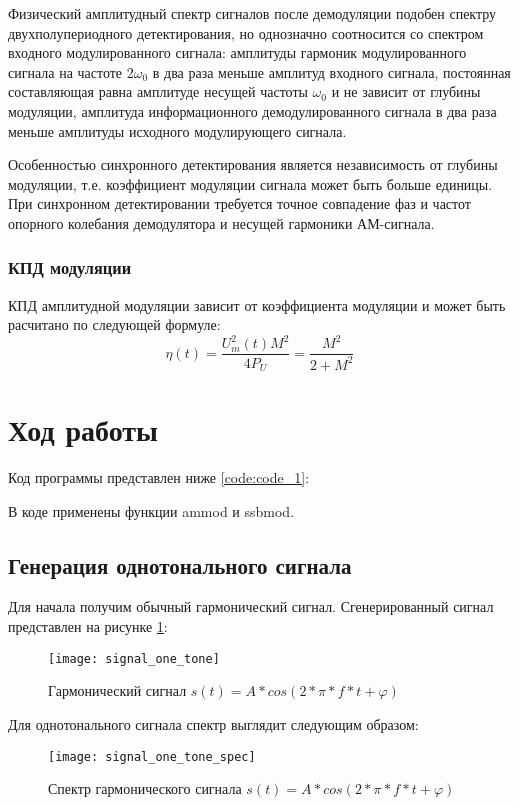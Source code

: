 Физический амплитудный спектр сигналов после демодуляции подобен спектру двухполупериодного детектирования, но однозначно соотносится со спектром входного модулированного сигнала: амплитуды гармоник модулированного сигнала на частоте 2$\omega_0$ в два раза меньше амплитуд входного сигнала, постоянная составляющая равна амплитуде несущей частоты $\omega_0$ и не зависит от глубины модуляции, амплитуда информационного демодулированного сигнала в два раза меньше амплитуды исходного модулирующего сигнала. 

Особенностью синхронного детектирования является независимость от глубины модуляции, т.е. коэффициент модуляции сигнала может быть больше единицы. При синхронном детектировании требуется точное совпадение фаз и частот опорного колебания демодулятора и несущей гармоники АМ-сигнала.

\subsubsection{КПД модуляции}
КПД амплитудной модуляции зависит от коэффициента модуляции и может быть расчитано по следующей формуле:
 \begin{equation}
	\eta (t) =\frac{ U_m^2(t) M^2}{4 P_U}  = \frac{M^2}{2 + M^2} 
\end{equation}



\section{Ход работы}
Код программы представлен ниже \ref{code:code_1}:

В коде применены функции ammod и ssbmod.

\subsection{Генерация однотонального сигнала}
Для начала получим обычный гармонический сигнал. Сгенерированный сигнал представлен на рисунке \ref{pic:signal_one_tone}:
\begin{figure}[H]
	\begin{center}
		\texttt{[image: signal\_one\_tone]}
		\caption{Гармонический сигнал $s(t) = A*cos(2*\pi * f*t + \varphi)$} 
		\label{pic:signal_one_tone} %
	\end{center}
\end{figure}
Для однотонального сигнала спектр выглядит следующим образом:
\begin{figure}[H]
	\begin{center}
		\texttt{[image: signal\_one\_tone\_spec]}
		\caption{Спектр гармонического сигнала $s(t) = A*cos(2*\pi * f*t + \varphi)$} 
		\label{pic:signal_one_tone_spec} %
	\end{center}
\end{figure}

